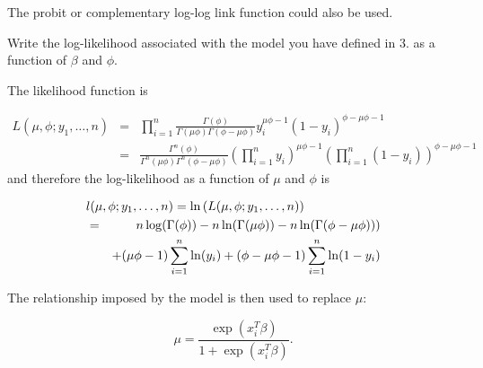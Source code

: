 \documentclass[11pt,a4paper%
addpoints, 
]{exam}
\begin{document}
\begin{questions}
\begin{solution}
The probit or complementary log-log link function could also be used. 

\end{solution}


\question[4] Write the log-likelihood associated with the model you have defined in 3. as a function of $\beta$ and $\phi$.

\begin{solution}
The likelihood function is

\begin{eqnarray*}
L(\mu,\phi; y_1, \ldots, n)  & = & \prod_{i=1}^n  \frac{\Gamma(\phi)}{\Gamma(\mu \phi) \Gamma ( \phi - \mu \phi)} y_i^{\mu \phi -1} (1-y_i)^{\phi - \mu \phi -1}\\
& = &  \frac{\Gamma^n(\phi)}{\Gamma^n(\mu \phi) \Gamma^n( \phi - \mu \phi)} \left( \prod_{i=1}^n y_i \right)^{\mu \phi -1} \left( \prod_{i=1}^n (1-y_i) \right)^{\phi - \mu \phi -1} 
\end{eqnarray*}
and therefore the log-likelihood as a function of $\mu$ and $\phi$ is

\begin{eqnarray*}
\lefteqn{l(\mu,\phi; y_1, \ldots, n)  = \ln \left(L(\mu,\phi; y_1, \ldots, n)  \right)} \\
& = & n \log(\Gamma(\phi)) - n \ln(\Gamma(\mu \phi)) -   n \ln(\Gamma( \phi - \mu \phi))) \\
&&+ (\mu \phi -1) \sum_{i=1}^n \ln(y_i) + (\phi - \mu \phi -1)  \sum_{i=1}^n \ln(1-y_i)
\end{eqnarray*}

The relationship imposed by the model is then used to replace $\mu$: 

$$\mu = \frac{\exp(x_i^T \beta)}{1+ \exp(x_i^T \beta)}.$$

\end{solution}



\clearpage
{}


\end{questions}
\end{document}
